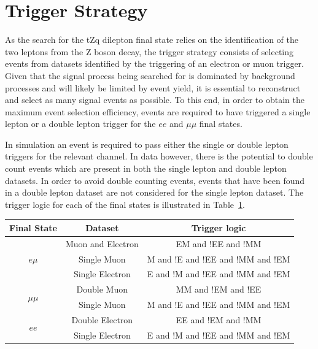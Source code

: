 \section{Trigger Strategy}\label{sec:triggerStrategy}
As the search for the tZq dilepton final state relies on the identification of the two leptons from the Z boson decay, the trigger strategy consists of selecting events from datasets identified by the triggering of an electron or muon trigger.
Given that the signal process being searched for is dominated by background processes and will likely be limited by event yield, it is essential to reconstruct and select as many signal events as possible.
To this end, in order to obtain the maximum event selection efficiency, events are required to have triggered a single lepton or a double lepton trigger for the $ee$ and $\mu\mu$ final states.

In simulation an event is required to pass either the single or double lepton triggers for the relevant channel.
In data however, there is the potential to double count events which are present in both the single lepton and double lepton datasets.
In order to avoid double counting events, events that have been found in a double lepton dataset are not considered for the single lepton dataset.
The trigger logic for each of the final states is illustrated in Table~\ref{tab:triggerCombo}.

\begin{table}[htbp]
\label{tab:triggerCombo}
  \centering
   \begin{tabular}{ccc}
   \hline
   \textbf{Final State} & \textbf{Dataset} & \textbf{Trigger logic}  \\
   \hline
   \multirow{3}{*}{$e\mu$} & Muon and Electron & EM and !EE and !MM \\
   & Single Muon & M and !E and !EE and !MM and !EM \\
   & Single Electron & E and !M and !EE and !MM and !EM \\
   \hline
   \multirow{2}{*}{$\mu\mu$} & Double Muon & MM and !EM and !EE\\
   & Single Muon & M and !E and !EE and !MM and !EM \\
   \hline  
   \multirow{2}{*}{$ee$} & Double Electron & EE and !EM and !MM \\
   & Single Electron & E and !M and !EE and !MM and !EM \\
   \hline
 \end{tabular}%
\end{table}

